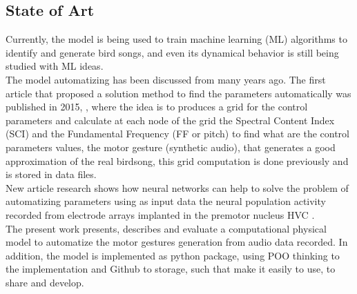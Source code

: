 \subsection{State of Art}

Currently, the model is being used to train machine learning (ML) algorithms to identify and generate bird songs, and even its dynamical behavior is still being studied with ML ideas.\\

The model automatizing has been discussed from many years ago. The first article that proposed a solution method to find the parameters automatically was published in 2015, \cite{automatization}, where the idea is to produces a grid for the control parameters and calculate at each node of the grid the Spectral Content Index (SCI) and the Fundamental Frequency (FF or pitch) to find what are the control parameters values, the motor gesture (synthetic audio), that generates a good approximation of the real birdsong, this grid computation is done previously and is stored in data files. \\

New article research shows how neural networks can help to solve the problem of automatizing parameters using as input data the neural population activity recorded from electrode arrays implanted in the
premotor nucleus HVC \cite{NNbirds}. \\

The present work presents, describes and evaluate a computational physical model to automatize the motor gestures generation from audio data recorded. In addition, the model is implemented as python package, using POO thinking to the implementation and Github to storage, such that make it easily to use, to share and develop.








